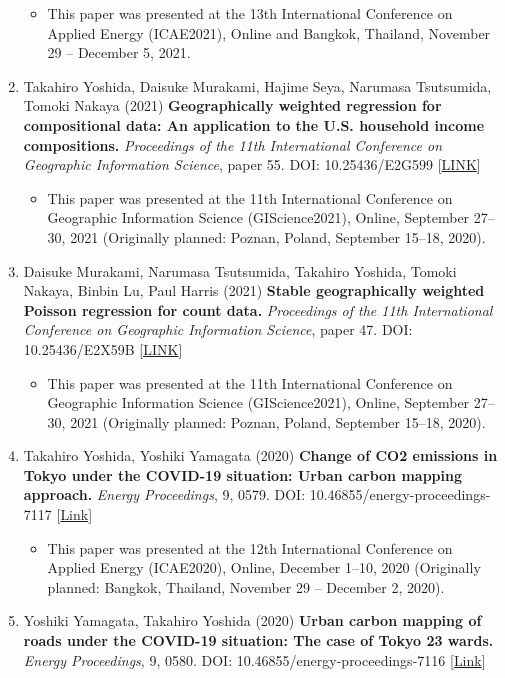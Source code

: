 \documentclass[
]{book}
\providecommand{\tightlist}{%
  \setlength{\itemsep}{0pt}\setlength{\parskip}{0pt}}
\begin{document}
\begin{enumerate}
  \begin{itemize}
  \tightlist
  \item
    This paper was presented at the 13th International Conference on Applied Energy (ICAE2021), Online and Bangkok, Thailand, November 29 -- December 5, 2021.
  \end{itemize}
\item
  Takahiro Yoshida, Daisuke Murakami, Hajime Seya, Narumasa Tsutsumida, Tomoki Nakaya (2021)
  \textbf{Geographically weighted regression for compositional data: An application to the U.S. household income compositions.}
  \emph{Proceedings of the 11th International Conference on Geographic Information Science}, paper 55.
  DOI: 10.25436/E2G599 {[}\href{https://escholarship.org/uc/item/62s7n79k}{LINK}{]}

  \begin{itemize}
  \tightlist
  \item
    This paper was presented at the 11th International Conference on Geographic Information Science (GIScience2021), Online, September 27--30, 2021 (Originally planned: Poznan, Poland, September 15--18, 2020).
  \end{itemize}
\item
  Daisuke Murakami, Narumasa Tsutsumida, Takahiro Yoshida, Tomoki Nakaya, Binbin Lu, Paul Harris (2021)
  \textbf{Stable geographically weighted Poisson regression for count data.}
  \emph{Proceedings of the 11th International Conference on Geographic Information Science}, paper 47.
  DOI: 10.25436/E2X59B {[}\href{https://escholarship.org/uc/item/8kg664zg}{LINK}{]}

  \begin{itemize}
  \tightlist
  \item
    This paper was presented at the 11th International Conference on Geographic Information Science (GIScience2021), Online, September 27--30, 2021 (Originally planned: Poznan, Poland, September 15--18, 2020).
  \end{itemize}
\item
  Takahiro Yoshida, Yoshiki Yamagata (2020)
  \textbf{Change of CO2 emissions in Tokyo under the COVID-19 situation: Urban carbon mapping approach.}
  \emph{Energy Proceedings}, 9, 0579.
  DOI: 10.46855/energy-proceedings-7117 {[}\href{https://doi.org/10.46855/energy-proceedings-7117}{Link}{]}

  \begin{itemize}
  \tightlist
  \item
    This paper was presented at the 12th International Conference on Applied Energy (ICAE2020), Online, December 1--10, 2020 (Originally planned: Bangkok, Thailand, November 29 -- December 2, 2020).
  \end{itemize}
\item
  Yoshiki Yamagata, Takahiro Yoshida (2020)
  \textbf{Urban carbon mapping of roads under the COVID-19 situation: The case of Tokyo 23 wards.}
  \emph{Energy Proceedings}, 9, 0580.
  DOI: 10.46855/energy-proceedings-7116 {[}\href{https://doi.org/10.46855/energy-proceedings-7116}{Link}{]}


\end{enumerate}
\end{document}

